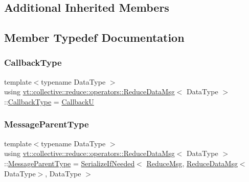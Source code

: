 \subsection*{Additional Inherited Members}


\subsection{Member Typedef Documentation}
\mbox{\label{structvt_1_1collective_1_1reduce_1_1operators_1_1_reduce_data_msg_a299d0d7f62e0e631ef344e345d89a4f3}} 
\subsubsection{\texorpdfstring{Callback\+Type}{CallbackType}}
{\footnotesize\ttfamily template$<$typename Data\+Type $>$ \\
using \hyperlink{structvt_1_1collective_1_1reduce_1_1operators_1_1_reduce_data_msg}{vt\+::collective\+::reduce\+::operators\+::\+Reduce\+Data\+Msg}$<$ Data\+Type $>$\+::\hyperlink{structvt_1_1collective_1_1reduce_1_1operators_1_1_reduce_data_msg_a299d0d7f62e0e631ef344e345d89a4f3}{Callback\+Type} =  \hyperlink{namespacevt_af79a43a97bc3593fc349f086c874c48e}{CallbackU}}

\mbox{\label{structvt_1_1collective_1_1reduce_1_1operators_1_1_reduce_data_msg_a6b5182cf48445f9d03dc6e5905a4eba1}} 
\subsubsection{\texorpdfstring{Message\+Parent\+Type}{MessageParentType}}
{\footnotesize\ttfamily template$<$typename Data\+Type $>$ \\
using \hyperlink{structvt_1_1collective_1_1reduce_1_1operators_1_1_reduce_data_msg}{vt\+::collective\+::reduce\+::operators\+::\+Reduce\+Data\+Msg}$<$ Data\+Type $>$\+::\hyperlink{structvt_1_1collective_1_1reduce_1_1operators_1_1_reduce_data_msg_a6b5182cf48445f9d03dc6e5905a4eba1}{Message\+Parent\+Type} =  \hyperlink{namespacevt_a0a4ad8c256fcffa564e9fa7800e4b495}{Serialize\+If\+Needed}$<$ \hyperlink{structvt_1_1collective_1_1reduce_1_1_reduce_msg}{Reduce\+Msg}, \hyperlink{structvt_1_1collective_1_1reduce_1_1operators_1_1_reduce_data_msg}{Reduce\+Data\+Msg}$<$Data\+Type$>$, Data\+Type $>$}




